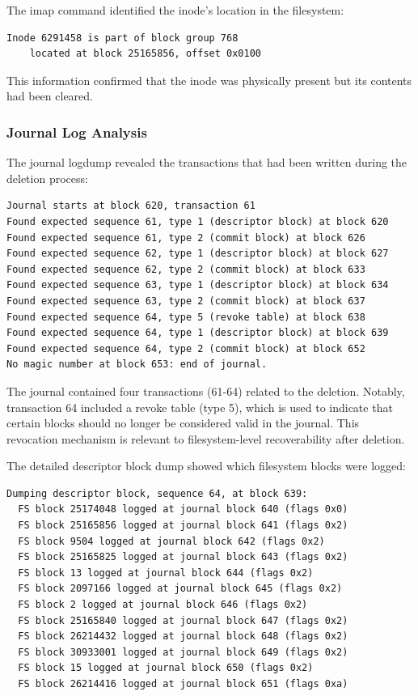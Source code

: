 The imap command identified the inode's location in the filesystem:

\begin{verbatim}
Inode 6291458 is part of block group 768
    located at block 25165856, offset 0x0100
\end{verbatim}

This information confirmed that the inode was physically present but its contents had been cleared.

\subsubsection*{Journal Log Analysis}

The journal logdump revealed the transactions that had been written during the deletion process:

\begin{verbatim}
Journal starts at block 620, transaction 61
Found expected sequence 61, type 1 (descriptor block) at block 620
Found expected sequence 61, type 2 (commit block) at block 626
Found expected sequence 62, type 1 (descriptor block) at block 627
Found expected sequence 62, type 2 (commit block) at block 633
Found expected sequence 63, type 1 (descriptor block) at block 634
Found expected sequence 63, type 2 (commit block) at block 637
Found expected sequence 64, type 5 (revoke table) at block 638
Found expected sequence 64, type 1 (descriptor block) at block 639
Found expected sequence 64, type 2 (commit block) at block 652
No magic number at block 653: end of journal.
\end{verbatim}

The journal contained four transactions (61-64) related to the deletion. Notably, transaction 64 included a revoke table (type 5), which is used to indicate that 
certain blocks should no longer be considered valid in the journal. This revocation mechanism is relevant to filesystem-level recoverability after deletion.

The detailed descriptor block dump showed which filesystem blocks were logged:

\begin{verbatim}
Dumping descriptor block, sequence 64, at block 639:
  FS block 25174048 logged at journal block 640 (flags 0x0)
  FS block 25165856 logged at journal block 641 (flags 0x2)
  FS block 9504 logged at journal block 642 (flags 0x2)
  FS block 25165825 logged at journal block 643 (flags 0x2)
  FS block 13 logged at journal block 644 (flags 0x2)
  FS block 2097166 logged at journal block 645 (flags 0x2)
  FS block 2 logged at journal block 646 (flags 0x2)
  FS block 25165840 logged at journal block 647 (flags 0x2)
  FS block 26214432 logged at journal block 648 (flags 0x2)
  FS block 30933001 logged at journal block 649 (flags 0x2)
  FS block 15 logged at journal block 650 (flags 0x2)
  FS block 26214416 logged at journal block 651 (flags 0xa)
\end{verbatim}

